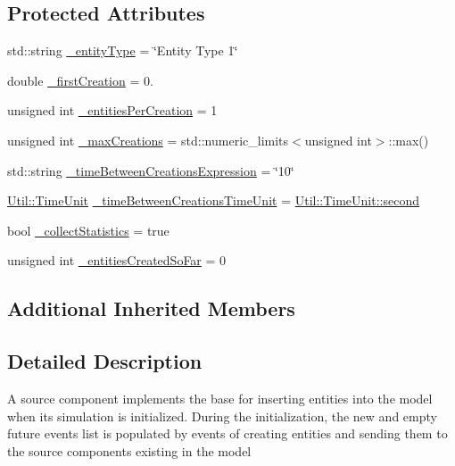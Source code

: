 \subsection*{Protected Attributes}
\begin{DoxyCompactItemize}
\item 
std\+::string \hyperlink{class_source_model_component_ad001e8ae30c828916f271ac72c7817d1}{\+\_\+entity\+Type} = \char`\"{}Entity Type 1\char`\"{}
\item 
double \hyperlink{class_source_model_component_ad58dddde2b6a81d85f261fa8a11243b3}{\+\_\+first\+Creation} = 0.
\item 
unsigned int \hyperlink{class_source_model_component_a68b0576903281a4716eb3ea0281dd133}{\+\_\+entities\+Per\+Creation} = 1
\item 
unsigned int \hyperlink{class_source_model_component_a99525d31bdc32efd5bbdcfbbbf115ec5}{\+\_\+max\+Creations} = std\+::numeric\+\_\+limits$<$unsigned int$>$\+::max()
\item 
std\+::string \hyperlink{class_source_model_component_ab0c96af4d61d8125773fa41cff865211}{\+\_\+time\+Between\+Creations\+Expression} = \char`\"{}10\char`\"{}
\item 
\hyperlink{class_util_a28504cc2fecc9aa47154cba4e625ec6f}{Util\+::\+Time\+Unit} \hyperlink{class_source_model_component_af34df20551bc223eb103ca87e9f1463e}{\+\_\+time\+Between\+Creations\+Time\+Unit} = \hyperlink{class_util_a28504cc2fecc9aa47154cba4e625ec6faa9f0e61a137d86aa9db53465e0801612}{Util\+::\+Time\+Unit\+::second}
\item 
bool \hyperlink{class_source_model_component_ac0c009ff9a2e8169d251118dabcd19eb}{\+\_\+collect\+Statistics} = true
\item 
unsigned int \hyperlink{class_source_model_component_af1f4fb38d2c0c4ac08235d7aec131bc9}{\+\_\+entities\+Created\+So\+Far} = 0
\end{DoxyCompactItemize}
\subsection*{Additional Inherited Members}


\subsection{Detailed Description}
A source component implements the base for inserting entities into the model when its simulation is initialized. During the initialization, the new and empty future events list is populated by events of creating entities and sending them to the source components existing in the model 

